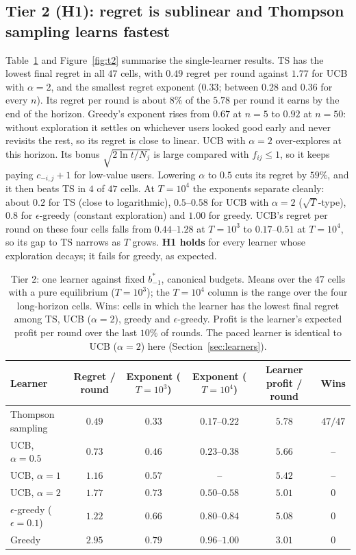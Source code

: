 \documentclass{article}
\theoremstyle{definition}
\begin{document}
\subsection{Tier 2 (H1): regret is sublinear and Thompson sampling learns fastest}
Table~\ref{tab:t2} and Figure~\ref{fig:t2} summarise the single-learner results. TS has the lowest final
regret in all $47$ cells, with $0.49$ regret per round against $1.77$ for UCB with $\alpha=2$, and the
smallest regret exponent ($0.33$; between $0.28$ and $0.36$ for every $n$). Its regret per round is
about $8\%$ of the $5.78$ per round it earns by the end of the horizon. Greedy's exponent rises from
$0.67$ at $n=5$ to $0.92$ at $n=50$: without exploration it settles on whichever users looked good early
and never revisits the rest, so its regret is close to linear. UCB with $\alpha=2$ over-explores at this
horizon. Its bonus $\sqrt{2\ln t/N_j}$ is large compared with $f_{ij}\le1$, so it keeps paying
$c_{-i,j}+1$ for low-value users. Lowering $\alpha$ to $0.5$ cuts its regret by $59\%$, and it then beats
TS in $4$ of $47$ cells. At $T=10^4$ the exponents separate cleanly: about $0.2$ for TS (close to
logarithmic), $0.5$--$0.58$ for UCB with $\alpha=2$ ($\sqrt T$-type), $0.8$ for $\epsilon$-greedy (constant
exploration) and $1.00$ for greedy. UCB's regret per round on these four cells falls from $0.44$--$1.28$ at
$T=10^3$ to $0.17$--$0.51$ at $T=10^4$, so its gap to TS narrows as $T$ grows.
\textbf{H1 holds} for every learner whose exploration decays; it fails for greedy, as expected.

\begin{table}[t]
\caption{Tier 2: one learner against fixed $b^\ast_{-1}$, canonical budgets. Means over the $47$ cells
with a pure equilibrium ($T=10^3$); the $T=10^4$ column is the range over the four long-horizon cells.
Wins: cells in which the learner has the lowest final regret among TS, UCB ($\alpha=2$), greedy and
$\epsilon$-greedy. Profit is the learner's expected profit per round over the last $10\%$ of rounds. The
paced learner is identical to UCB ($\alpha=2$) here (Section~\ref{sec:learners}).}
\label{tab:t2}
\centering\small
\begin{tabular}{@{}lccccc@{}}
\toprule
Learner & Regret / round & Exponent ($T=10^3$) & Exponent ($T=10^4$) & Learner profit / round & Wins\\
\midrule
Thompson sampling & $\mathbf{0.49}$ & $\mathbf{0.33}$ & $\mathbf{0.17}$--$\mathbf{0.22}$ & $\mathbf{5.78}$ & $47/47$\\
UCB, $\alpha=0.5$ & $0.73$ & $0.46$ & $0.23$--$0.38$ & $5.66$ & --\\
UCB, $\alpha=1$ & $1.16$ & $0.57$ & -- & $5.42$ & --\\
UCB, $\alpha=2$ & $1.77$ & $0.73$ & $0.50$--$0.58$ & $5.01$ & $0$\\
$\epsilon$-greedy ($\epsilon=0.1$) & $1.22$ & $0.66$ & $0.80$--$0.84$ & $5.08$ & $0$\\
Greedy & $2.95$ & $0.79$ & $0.96$--$1.00$ & $3.01$ & $0$\\
\bottomrule
\end{tabular}
\end{table}
\end{document}
